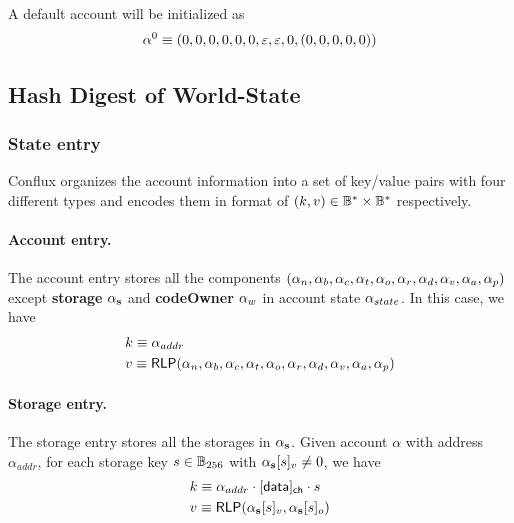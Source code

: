

A default account will be initialized as 
%
\begin{align}\label{eq:default_acc}
	\mathbf{\alpha}^0\equiv (0,0,0,0,0,0,\mathbb{\varepsilon}, \mathbb{\varepsilon}, 0,(0,0,0,0,0))
\end{align}

\subsection{Hash Digest of World-State}

\subsubsection{State entry}

Conflux organizes the account information into a set of key/value pairs with four different types and encodes them in format of $(k,v)\in \mathbb{B}^*\times \mathbb{B}^*$ respectively. 

\paragraph{Account entry.} The account entry stores all the components $\left( \mathbf{\alpha}_n, \mathbf{\alpha}_b, \mathbf{\alpha}_c,\mathbf{\alpha}_t, \mathbf{\alpha}_o, \mathbf{\alpha}_r, \mathbf{\alpha}_d, \mathbf{\alpha}_v, \mathbf{\alpha}_a, \mathbf{\alpha}_p\right)$ except {\bf storage} $\mathbf{\alpha}_{\bf s}$ and {\bf codeOwner} {$\mathbf{\alpha}_w$} in account state $\mathbf{\alpha}_{state}$. In this case, we have 
\begin{align}
	&k\equiv \alpha_{addr}\\
	&v\equiv \mathsf{RLP}(\mathbf{\alpha}_n, \mathbf{\alpha}_b, \mathbf{\alpha}_c,\mathbf{\alpha}_t, \mathbf{\alpha}_o, \mathbf{\alpha}_r, \mathbf{\alpha}_d, \mathbf{\alpha}_v, \mathbf{\alpha}_a, \mathbf{\alpha}_p)
\end{align}

\paragraph{Storage entry.} The storage entry stores all the storages in $\mathbf{\alpha}_{\bf s}$. Given account $\alpha$ with address $\alpha_{addr}$, for each storage key $s\in \mathbb{B}_{256}$ with $\mathbf{\alpha}_{\bf s}[s]_v\neq 0$, we have 
\begin{align}
	&k\equiv \alpha_{addr}\cdot [{\sf data}]_{\sf ch}\cdot s \\
	&v\equiv \mathsf{RLP}(\mathbf{\alpha}_{\bf s}[s]_v,\mathbf{\alpha}_{\bf s}[s]_o)
\end{align}

